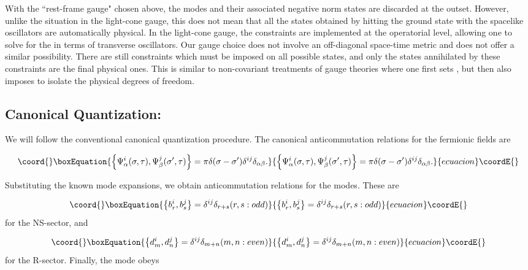 \documentclass[a4paper,a4paper]{article}
\begin{document}
With the ``rest-frame gauge" chosen above,  the \coordHE{}
modes and their associated negative norm  states \cite{Gursoy} are
discarded at the outset.  However, unlike the situation in the
light-cone gauge, this does not mean that all the states obtained
by hitting the ground state with the spacelike oscillators are
automatically physical. In the light-cone gauge, the constraints
are implemented at the operatorial level, allowing one to solve
for the \coordHE{} in terms of transverse oscillators.  Our
gauge choice does not involve an off-diagonal space-time
metric and does not offer a similar possibility.  There are still
constraints which must be imposed on all possible states, and only
the states annihilated by these constraints are the final physical
ones. This is similar to non-covariant treatments of gauge
theories where one first sets \coordHE{}, but then also imposes
\coordHE{} to isolate the physical degrees of freedom.


\subsection{Canonical Quantization:}

We will follow the conventional canonical quantization procedure.
The canonical anticommutation relations for the fermionic fields
are

\begin{equation}\coord{}\boxEquation{
\left\{\Psi_{\alpha}^{i}(\sigma, \tau), \Psi_{\beta}^{j}(\sigma',
\tau)\right\}=\pi\delta(\sigma-\sigma')\delta^{ij}\delta_{\alpha\beta}.
}{
\left\{\Psi_{\alpha}^{i}(\sigma, \tau), \Psi_{\beta}^{j}(\sigma',
\tau)\right\}=\pi\delta(\sigma-\sigma')\delta^{ij}\delta_{\alpha\beta}.
}{ecuacion}\coordE{}\end{equation}

Substituting the known mode expansions, we obtain anticommutation
relations for the modes.  These are

\begin{equation}\coord{}\boxEquation{
\left\{b_{r}^{i}, b_{s}^{j}\right\}=\delta^{ij}\delta_{r+s} (r, s:
odd )
}{
\left\{b_{r}^{i}, b_{s}^{j}\right\}=\delta^{ij}\delta_{r+s} (r, s:
odd )
}{ecuacion}\coordE{}\end{equation}
for the NS-sector, and

\begin{equation}\coord{}\boxEquation{
\left\{d_{m}^{i}, d_{n}^{j}\right\}=\delta^{ij}\delta_{m+n} (m,n:
even)
}{
\left\{d_{m}^{i}, d_{n}^{j}\right\}=\delta^{ij}\delta_{m+n} (m,n:
even)
}{ecuacion}\coordE{}\end{equation}
for the R-sector. Finally, the \coordHE{} mode obeys
\end{document}
